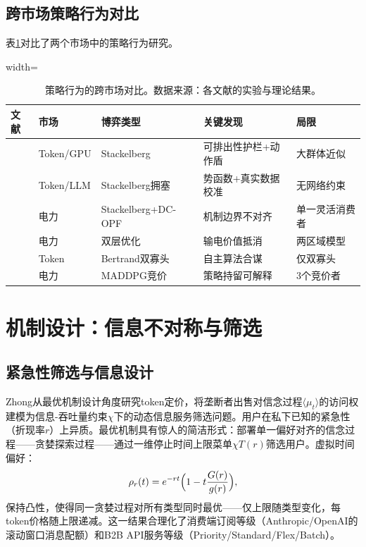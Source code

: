 \documentclass[11pt,twocolumn]{article}
\begin{document}
\subsection{跨市场策略行为对比}

表\ref{tab:strategic}对比了两个市场中的策略行为研究。

\begin{table}[htbp]
\centering
\caption{策略行为的跨市场对比。数据来源：各文献的实验与理论结果。}
\label{tab:strategic}
\scriptsize
\begin{adjustbox}{width=\columnwidth}
\begin{tabular}{p{1.5cm}p{1.8cm}p{2cm}p{2cm}p{2cm}}
\toprule
\textbf{文献} & \textbf{市场} & \textbf{博弈类型} & \textbf{关键发现} & \textbf{局限} \\
\midrule
\cite{yan2026stackelberg} & Token/GPU & Stackelberg & 可排出性护栏+动作盾 & 大群体近似 \\
\cite{guo2025prilm} & Token/LLM & Stackelberg拥塞 & 势函数+真实数据校准 & 无网络约束 \\
\cite{brenner2026spatial} & 电力 & Stackelberg+DC-OPF & 机制边界不对齐 & 单一灵活消费者 \\
\cite{brenner2025strategic} & 电力 & 双层优化 & 输电价值抵消 & 两区域模型 \\
\cite{fish2024algorithmic} & Token & Bertrand双寡头 & 自主算法合谋 & 仅双寡头 \\
\cite{du2021approximating} & 电力 & MADDPG竞价 & 策略持留可解释 & 3个竞价者 \\
\bottomrule
\end{tabular}
\end{adjustbox}
\end{table}

\section{机制设计：信息不对称与筛选}

\subsection{紧急性筛选与信息设计}

Zhong\cite{zhong2026token}从最优机制设计角度研究token定价，将垄断者出售对信念过程$\langle \mu_t \rangle$的访问权建模为信息-吞吐量约束$\chi$下的动态信息服务筛选问题。用户在私下已知的紧急性（折现率$r$）上异质。最优机制具有惊人的简洁形式：部署单一偏好对齐的信念过程——贪婪探索过程——通过一维停止时间上限菜单$\chi T(r)$筛选用户。虚拟时间偏好：
\begin{equation}
\rho_r(t) = e^{-rt}\Bigl(1 - t \frac{G(r)}{g(r)}\Bigr),
\label{eq:virtual}
\end{equation}
保持凸性，使得同一贪婪过程对所有类型同时最优——仅上限随类型变化，每token价格随上限递减。这一结果合理化了消费端订阅等级（Anthropic/OpenAI的滚动窗口消息配额）和B2B API服务等级（Priority/Standard/Flex/Batch）。
\end{document}
